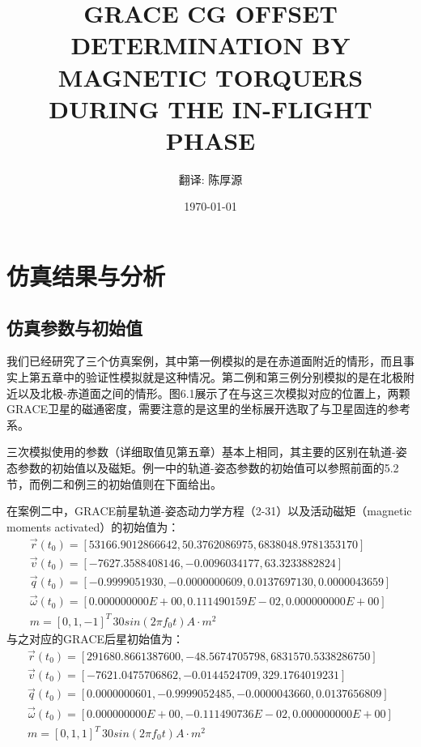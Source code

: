 \documentclass[UTF8,12pt,a4paper,floats,amsmath,amssymb]{ctexart}
\begin{document}
\title{GRACE CG OFFSET DETERMINATION BY MAGNETIC TORQUERS DURING THE IN-FLIGHT PHASE}

\date{\today}

\author{翻译: 陈厚源}

\maketitle

\section{仿真结果与分析}

\subsection{仿真参数与初始值}

我们已经研究了三个仿真案例，其中第一例模拟的是在赤道面附近的情形，而且事实上第五章中的验证性模拟就是这种情况。第二例和第三例分别模拟的是在北极附近以及北极-赤道面之间的情形。图6.1展示了在与这三次模拟对应的位置上，两颗GRACE卫星的磁通密度，需要注意的是这里的坐标展开选取了与卫星固连的参考系。

三次模拟使用的参数（详细取值见第五章）基本上相同，其主要的区别在轨道-姿态参数的初始值以及磁矩。例一中的轨道-姿态参数的初始值可以参照前面的5.2节，而例二和例三的初始值则在下面给出。


在案例二中，GRACE前星轨道-姿态动力学方程（2-31）以及活动磁矩（magnetic moments activated）的初始值为：
\begin{equation} \label{attitude_dynamics_2_front}
\begin{array}{l}
\vec{r}(t_0) = [53166.9012866642, 50.3762086975, 6838048.9781353170]\\
\vec{v}(t_0) = [-7627.3588408146, -0.0096034177, 63.3233882824]\\
\vec{q}(t_0) = [-0.9999051930, -0.0000000609, 0.0137697130, 0.0000043659]\\
\vec{\omega}(t_0) = [0.000000000E+00, 0.111490159E-02, 0.000000000E+00]\\
m = {[0, 1, −1]}^{T} \, 30 sin(2 \pi f_0 t)A \cdot m^2
\end{array}
\end{equation}
与之对应的GRACE后星初始值为：
\begin{equation} \label{attitude_dynamics_2_back}
\begin{array}{l}
\vec{r}(t_0) = [291680.8661387600, -48.5674705798, 6831570.5338286750]\\
\vec{v}(t_0) = [-7621.0475706862, -0.0144524709, 329.1764019231]\\
\vec{q}(t_0) = [0.0000000601, -0.9999052485, -0.0000043660, 0.0137656809]\\
\vec{\omega}(t_0) = [0.000000000E+00, -0.111490736E-02, 0.000000000E+00]\\
m = {[0, 1, 1]}^{T} \, 30 sin(2 \pi f_0 t)A \cdot m^2
\end{array}
\end{equation}
\end{document}
